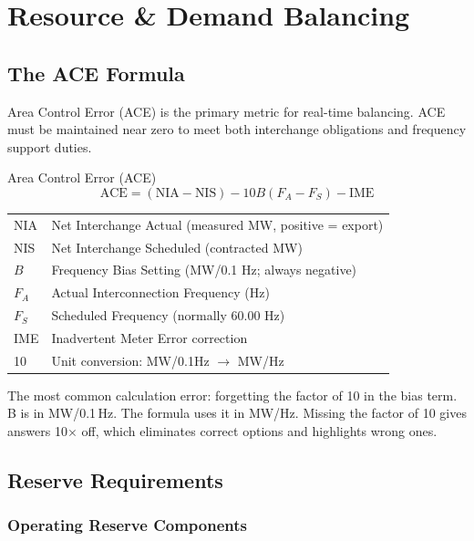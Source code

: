 \documentclass[12pt,twoside,openright]{memoir}
\begin{document}
\chapter{Resource \& Demand Balancing}
\label{ch:balancing}

\section{The ACE Formula}

Area Control Error (ACE) is the primary metric for real-time balancing. ACE must be
maintained near zero to meet both interchange obligations and frequency support duties.

\begin{formulabox}{Area Control Error (ACE)}
\[
\text{ACE} = (\text{NIA} - \text{NIS}) - 10B(F_A - F_S) - \text{IME}
\]

\begin{tabular}{@{}ll@{}}
NIA & Net Interchange Actual (measured MW, positive = export) \\
NIS & Net Interchange Scheduled (contracted MW) \\
$B$ & Frequency Bias Setting (MW/0.1 Hz; always negative) \\
$F_A$ & Actual Interconnection Frequency (Hz) \\
$F_S$ & Scheduled Frequency (normally 60.00 Hz) \\
IME & Inadvertent Meter Error correction \\
10 & Unit conversion: MW/0.1Hz $\rightarrow$ MW/Hz \\
\end{tabular}
\end{formulabox}

\begin{examtip}
The most common calculation error: forgetting the factor of 10 in the bias term.
B is in MW/0.1\,Hz. The formula uses it in MW/Hz. Missing the factor of 10 gives
answers 10$\times$ off, which eliminates correct options and highlights wrong ones.
\end{examtip}

\section{Reserve Requirements}

\subsection{Operating Reserve Components}
\end{document}
